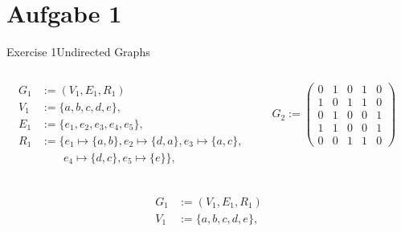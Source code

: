 
\section{Aufgabe 1}

\setcounter{task}{1}

\begin{frame}[allowframebreaks]{Exercise 1}{Undirected Graphs}
  \begin{requirementsnoinc}
    \begin{columns}
      \begin{column}{0.6\textwidth}
        \centering
        \begin{align*}
          G_1 &:= (V_1, E_1, R_1)\\
          V_1 &:= \{a, b, c, d, e\},\\
          E_1 &:= \{e_1, e_2, e_3, e_4, e_5\},\\
          R_1 &:= \{e_1 \mapsto \{a, b\} , e_2 \mapsto \{d, a\}, e_3 \mapsto \{a, c\},\\\ & \qquad e_4 \mapsto \{d, c\}, e_5 \mapsto \{e\}\},\\
        \end{align*}
      \end{column}
      \begin{column}{0.4\textwidth}
        \centering
        $G_2 :=
        \begin{pmatrix}
        0 & 1 & 0 & 1 & 0 \\
        1 & 0 & 1 & 1 & 0 \\
        0 & 1 & 0 & 0 & 1 \\
        1 & 1 & 0 & 0 & 1 \\
        0 & 0 & 1 & 1 & 0
        \end{pmatrix}$
      \end{column}
    \end{columns}
  \end{requirementsnoinc}
  \begin{solutionnoinc}
    \begin{columns}
      \begin{column}{0.6\textwidth}
        \centering
        \begin{align*}
          G_1 &:= (V_1, E_1, R_1)\\
          V_1 &:= \{a, b, c, d, e\},\\

\end{align*}
\end{column}
\end{columns}
\end{solutionnoinc}
\end{frame}
